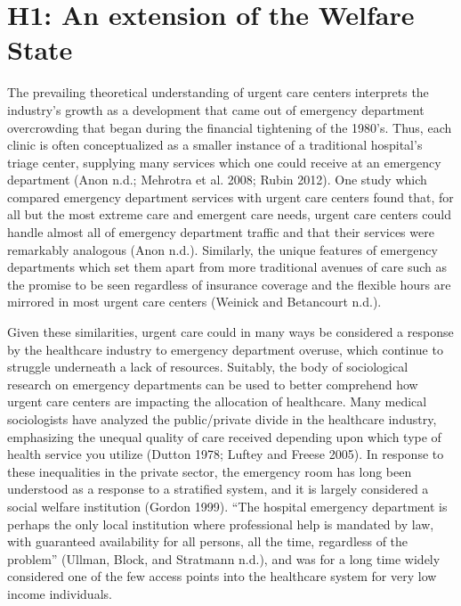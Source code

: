 \documentclass[12pt,twoside]{reedthesis}
\begin{document}
  \section*{H1: An extension of the Welfare
  State}\label{h1-an-extension-of-the-welfare-state}
  
  The prevailing theoretical understanding of urgent care centers
  interprets the industry's growth as a development that came out of
  emergency department overcrowding that began during the financial
  tightening of the 1980's. Thus, each clinic is often conceptualized as a
  smaller instance of a traditional hospital's triage center, supplying
  many services which one could receive at an emergency department (Anon
  n.d.; Mehrotra et al. 2008; Rubin 2012). One study which compared
  emergency department services with urgent care centers found that, for
  all but the most extreme care and emergent care needs, urgent care
  centers could handle almost all of emergency department traffic and that
  their services were remarkably analogous (Anon n.d.). Similarly, the
  unique features of emergency departments which set them apart from more
  traditional avenues of care such as the promise to be seen regardless of
  insurance coverage and the flexible hours are mirrored in most urgent
  care centers (Weinick and Betancourt n.d.).
  
  Given these similarities, urgent care could in many ways be considered a
  response by the healthcare industry to emergency department overuse,
  which continue to struggle underneath a lack of resources. Suitably, the
  body of sociological research on emergency departments can be used to
  better comprehend how urgent care centers are impacting the allocation
  of healthcare. Many medical sociologists have analyzed the
  public/private divide in the healthcare industry, emphasizing the
  unequal quality of care received depending upon which type of health
  service you utilize (Dutton 1978; Luftey and Freese 2005). In response
  to these inequalities in the private sector, the emergency room has long
  been understood as a response to a stratified system, and it is largely
  considered a social welfare institution (Gordon 1999). ``The hospital
  emergency department is perhaps the only local institution where
  professional help is mandated by law, with guaranteed availability for
  all persons, all the time, regardless of the problem'' (Ullman, Block,
  and Stratmann n.d.), and was for a long time widely considered one of
  the few access points into the healthcare system for very low income
  individuals.
  
\end{document}
